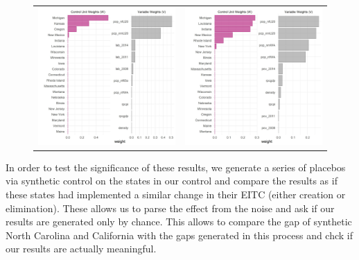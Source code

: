 \documentclass{article}
\begin{document}
\begin{figure}
\begin{center}
\begin{tabular}{cc}
 \includegraphics[width=80mm]{nc_lab_weights} &   \includegraphics[width=80mm]{nc_pov_weights} \\
\end{tabular}
\end{center}
\label{fig:weights}{}
\end{figure}

\restoregeometry

In order to test the significance of these results, we generate a series of placebos via synthetic control on the states in our control and compare the results as if these states had implemented a similar change in their EITC (either creation or elimination). These allows us to parse the effect from the noise and ask if our results are generated only by chance. This allows to compare the gap of synthetic North Carolina and California with the gaps generated in this process and chck if our results are actually meaningful.
\end{document}
